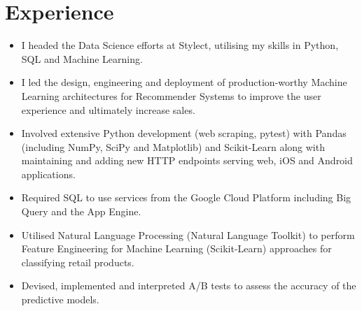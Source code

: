 \documentclass[11pt,a4paper,sans]{moderncv}        %
\begin{document}
\section{Experience}
\vspace*{-0.15cm}
{
\begin{itemize}%
\item I headed the Data Science efforts at Stylect, utilising my skills in Python, SQL and Machine Learning.
\item I led the design, engineering and deployment of production-worthy Machine Learning architectures for Recommender Systems to improve the user experience and ultimately increase sales.
\item Involved extensive Python development (web scraping, pytest) with Pandas (including NumPy, SciPy and Matplotlib) and Scikit-Learn along with maintaining and adding new HTTP endpoints serving web, iOS and Android applications.
\item Required SQL to use services from the Google Cloud Platform including Big Query and the App Engine.
\item Utilised Natural Language Processing (Natural Language Toolkit) to perform Feature Engineering for Machine Learning (Scikit-Learn) approaches for classifying retail products.
\item Devised, implemented and interpreted A/B tests to assess the accuracy of the predictive models.
\end{itemize}
}
\vspace*{-0.15cm}
\end{document}
